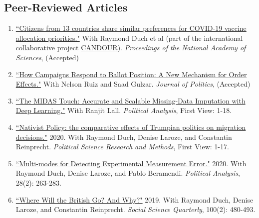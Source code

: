 \documentclass[11pt, a4paper]{article}
\begin{document}
 \subsection*{Peer-Reviewed Articles}

 \begin{enumerate}

 \item \href{https://doi.org/10.1101/2021.01.31.21250866}{``Citizens from 13 countries share similar preferences for COVID-19 vaccine allocation priorities."} With Raymond Duch et al (part of the international collaborative project \href{https://oxford-candour.com/}{CANDOUR}). \textit{Proceedings of the National Academy of Sciences}, (Accepted)

 \item \href{https://ts-robinson.com/publication/gulzar-how-campaigns-respond-2020/gulzar-how-campaigns-respond-2020.pdf}{``How Campaigns Respond to Ballot Position: A New Mechanism for Order Effects."} With Nelson Ruiz and Saad Gulzar. \textit{Journal of Politics}, (Accepted)

 \item \href{https://doi.org/10.1017/pan.2020.49}{``The MIDAS Touch: Accurate and Scalable Missing-Data Imputation with Deep Learning."} With Ranjit Lall. \textit{Political Analysis}, First View: 1-18.

 \item \href{https://doi.org/10.1017/psrm.2020.33}{``Nativist Policy: the comparative effects of Trumpian politics on migration decisions."} 2020. With Raymond Duch, Denise Laroze, and Constantin Reinprecht. \textit{Political Science Research and Methods}, First View: 1-17.

 \item \href{https://www.cambridge.org/core/journals/political-analysis/article/multimodes-for-detecting-experimental-measurement-error/37514FC46CF29C7B345DB9881E252150/share/7b059037b0da9182a33316d7f87b2de81b619592}{``Multi-modes for Detecting Experimental Measurement Error."} 2020. With Raymond Duch, Denise Laroze, and Pablo Beramendi. \textit{Political Analysis}, 28(2): 263-283.

 \item \href{https://doi.org/10.1111/ssqu.12584}{``Where Will the British Go? And Why?"} 2019. With Raymond Duch, Denise Laroze, and Constantin Reinprecht. \textit{Social Science Quarterly}, 100(2): 480-493. 

\end{enumerate}
\end{document}
